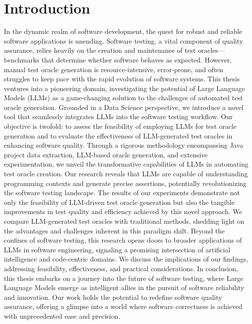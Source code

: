 \chapter{Introduction}
\label{cha:introduction}
\vspace{0.4 cm}

In the dynamic realm of software development, the quest for robust and reliable software applications is unending. Software testing, a vital component of quality assurance, relies heavily on the creation and maintenance of test oracles—benchmarks that determine whether software behaves as expected. However, manual test oracle generation is resource-intensive, error-prone, and often struggles to keep pace with the rapid evolution of software systems. This thesis ventures into a pioneering domain, investigating the potential of Large Language Models (LLMs) as a game-changing solution to the challenges of automated test oracle generation. Grounded in a Data Science perspective, we introduce a novel tool that seamlessly integrates LLMs into the software testing workflow. Our objective is twofold: to assess the feasibility of employing LLMs for test oracle generation and to evaluate the effectiveness of LLM-generated test oracles in enhancing software quality. Through a rigorous methodology encompassing Java project data extraction, LLM-based oracle generation, and extensive experimentation, we unveil the transformative capabilities of LLMs in automating test oracle creation. Our research reveals that LLMs are capable of understanding programming contexts and generate precise assertions, potentially revolutionizing the software testing landscape. The results of our experiments demonstrate not only the feasibility of LLM-driven test oracle generation but also the tangible improvements in test quality and efficiency achieved by this novel approach. We compare LLM-generated test oracles with traditional methods, shedding light on the advantages and challenges inherent in this paradigm shift. Beyond the confines of software testing, this research opens doors to broader applications of LLMs in software engineering, signaling a promising intersection of artificial intelligence and code-centric domains. We discuss the implications of our findings, addressing feasibility, effectiveness, and practical considerations. In conclusion, this thesis embarks on a journey into the future of software testing, where Large Language Models emerge as intelligent allies in the pursuit of software reliability and innovation. Our work holds the potential to redefine software quality assurance, offering a glimpse into a world where software correctness is achieved with unprecedented ease and precision.

